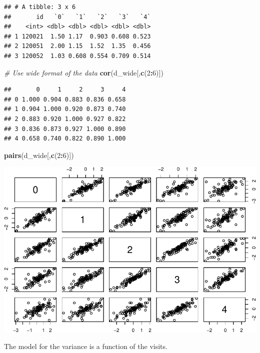 \documentclass[
]{article}
\newenvironment{Shaded}{\begin{snugshade}}{\end{snugshade}}
\newcommand{\CommentTok}[1]{\textcolor[rgb]{0.56,0.35,0.01}{\textit{#1}}}
\newcommand{\DecValTok}[1]{\textcolor[rgb]{0.00,0.00,0.81}{#1}}
\newcommand{\FunctionTok}[1]{\textcolor[rgb]{0.13,0.29,0.53}{\textbf{#1}}}
\newcommand{\NormalTok}[1]{#1}
\newcommand{\SpecialCharTok}[1]{\textcolor[rgb]{0.81,0.36,0.00}{\textbf{#1}}}
\begin{document}
\begin{verbatim}
## # A tibble: 3 x 6
##       id   `0`   `1`   `2`   `3`   `4`
##    <int> <dbl> <dbl> <dbl> <dbl> <dbl>
## 1 120021  1.50 1.17  0.903 0.608 0.523
## 2 120051  2.00 1.15  1.52  1.35  0.456
## 3 120052  1.03 0.608 0.554 0.709 0.514
\end{verbatim}

\begin{Shaded}
\begin{Highlighting}[]
\CommentTok{\# Use wide format of the data}
\FunctionTok{cor}\NormalTok{(d\_wide[,}\FunctionTok{c}\NormalTok{(}\DecValTok{2}\SpecialCharTok{:}\DecValTok{6}\NormalTok{)])}
\end{Highlighting}
\end{Shaded}

\begin{verbatim}
##       0     1     2     3     4
## 0 1.000 0.904 0.883 0.836 0.658
## 1 0.904 1.000 0.920 0.873 0.740
## 2 0.883 0.920 1.000 0.927 0.822
## 3 0.836 0.873 0.927 1.000 0.890
## 4 0.658 0.740 0.822 0.890 1.000
\end{verbatim}

\begin{Shaded}
\begin{Highlighting}[]
\FunctionTok{pairs}\NormalTok{(d\_wide[,}\FunctionTok{c}\NormalTok{(}\DecValTok{2}\SpecialCharTok{:}\DecValTok{6}\NormalTok{)])}
\end{Highlighting}
\end{Shaded}

\includegraphics{ProblemSet3_Siyu_Zou_files/figure-latex/unnamed-chunk-8-1.pdf}

The model for the variance is a function of the visits.
\end{document}

